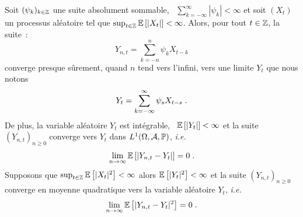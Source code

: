 \begin{theorem}
 \label{theo:filtragepassl}
 Soit $(\psi_k)_{k\in\mathbb{Z}}$ une suite absolument sommable, \ie\ $\sum_{k= -\infty}^\infty |\psi_k| < \infty$
et soit $(X_{t})$ un processus al\'eatoire tel que $\sup_{t \in \mathbb{Z}} {\mathbb E}\left[ |X_{t}| \right] < \infty$.
Alors, pour tout $t \in \mathbb{Z}$, la suite~:
\[
Y_{n,t} = \sum_{k=-n}^n \psi_k X_{t-k}
\]
converge presque s\^urement, quand $n$ tend vers l'infini, vers
une limite $Y_t$ que nous notons
$$
Y_{t} = \sum_{k=-\infty}^\infty \psi_s X_{t-s}\;.
$$
De plus, la variable al\'eatoire $Y_t$ est int\'egrable, \ie\ ${\mathbb E}\left[ |Y_t| \right] < \infty$ et la suite $(Y_{n,t})_{n \geq 0}$
converge vers $Y_t$ dans  $L^1(\Omega,\mathcal{A},\mathbb{P})$, \textit{i.e.}
$$
\lim_{n \rightarrow \infty} {\mathbb E}\left[  |Y_{n,t} - Y_{t}| \right] = 0 \;.
$$
Supposons que $\sup_{t \in \mathbb{Z}} {\mathbb E}\left[ |X_t|^2 \right] < \infty$ alors
${\mathbb E}\left[ |Y_{t}|^2 \right] < \infty$ et la suite $(Y_{n,t})_{n \geq 0}$ converge en moyenne quadratique vers la variable
al\'eatoire $Y_{t}$, \textit{i.e.}
$$
\lim_{n \rightarrow \infty} {\mathbb E}\left[ |Y_{n,t} - Y_{t}|^2 \right] = 0 \;.
$$
\end{theorem}

